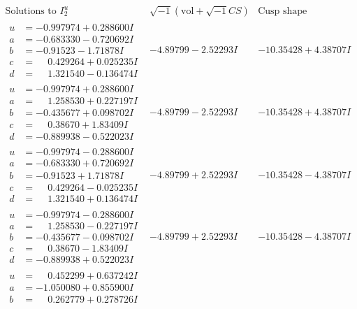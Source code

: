 \documentclass[1p]{elsarticle_modified}
\theoremstyle{definition}
\newcommand{\I}{\sqrt{-1}}
\begin{document}
$$\begin{array}{c|c|c}  
\text{Solutions to }I^u_{2}& \I (\text{vol} + \sqrt{-1}CS) & \text{Cusp shape}\\
 \hline 
\begin{aligned}
u &= -0.997974 + 0.288600 I \\
a &= -0.683330 - 0.720692 I \\
b &= -0.91523 - 1.71878 I \\
c &= \phantom{-}0.429264 + 0.025235 I \\
d &= \phantom{-}1.321540 - 0.136474 I\end{aligned}
 & -4.89799 - 2.52293 I & -10.35428 + 4.38707 I \\ \hline\begin{aligned}
u &= -0.997974 + 0.288600 I \\
a &= \phantom{-}1.258530 + 0.227197 I \\
b &= -0.435677 + 0.098702 I \\
c &= \phantom{-}0.38670 + 1.83409 I \\
d &= -0.889938 - 0.522023 I\end{aligned}
 & -4.89799 - 2.52293 I & -10.35428 + 4.38707 I \\ \hline\begin{aligned}
u &= -0.997974 - 0.288600 I \\
a &= -0.683330 + 0.720692 I \\
b &= -0.91523 + 1.71878 I \\
c &= \phantom{-}0.429264 - 0.025235 I \\
d &= \phantom{-}1.321540 + 0.136474 I\end{aligned}
 & -4.89799 + 2.52293 I & -10.35428 - 4.38707 I \\ \hline\begin{aligned}
u &= -0.997974 - 0.288600 I \\
a &= \phantom{-}1.258530 - 0.227197 I \\
b &= -0.435677 - 0.098702 I \\
c &= \phantom{-}0.38670 - 1.83409 I \\
d &= -0.889938 + 0.522023 I\end{aligned}
 & -4.89799 + 2.52293 I & -10.35428 - 4.38707 I \\ \hline\begin{aligned}
u &= \phantom{-}0.452299 + 0.637242 I \\
a &= -1.050080 + 0.855900 I \\
b &= \phantom{-}0.262779 + 0.278726 I \\

\end{aligned}
\end{array}$$
\end{document}
